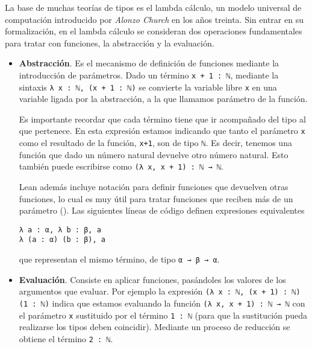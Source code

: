 La base de muchas teorías de tipos es el lambda cálculo, un modelo universal de
computación introducido por \textit{Alonzo Church} en los años treinta. Sin
entrar en su formalización, en el lambda cálculo se consideran dos operaciones
fundamentales para tratar con funciones, la abstracción y la evaluación.

\begin{itemize}

	\item \textbf{Abstracción}. Es el mecanismo de definición de funciones mediante
	      la introducción de parámetros. Dado un término \lstinline{x + 1 : ℕ},
	      mediante la sintaxis \lstinline{λ x : ℕ, (x + 1 : ℕ)} se convierte la
	      variable libre \lstinline{x} en una variable ligada por la abstracción, a la
	      que llamamos parámetro de la función.

	      Es importante recordar que cada término tiene que ir acompañado del tipo al
	      que pertenece. En esta expresión estamos indicando que tanto el parámetro
	      \lstinline{x} como el resultado de la función, \lstinline{x+1}, son de tipo
	      \lstinline{ℕ}. Es decir, tenemos una función que dado un número natural
	      devuelve otro número natural. Esto también puede escribirse como
	      \lstinline{(λ x, x + 1) : ℕ → ℕ}.

	      Lean además incluye notación para definir funciones que devuelven otras
	      funciones, lo cual es muy útil para tratar funciones que reciben más de un
	      parámetro (). Las siguientes líneas de código
	      definen expresiones equivalentes
	      \begin{lstlisting}
λ a : α, λ b : β, a
λ (a : α) (b : β), a
\end{lstlisting}
	      que representan el mismo término, de tipo \lstinline{α → β → α}.

	\item \textbf{Evaluación}. Consiste en aplicar funciones, pasándoles los
	      valores de los argumentos que evaluar. Por ejemplo la expresión
	      \lstinline{(λ x : ℕ, (x + 1) : ℕ) (1 : ℕ)} indica que estamos evaluando la
	      función \lstinline{(λ x, x + 1) : ℕ → ℕ} con el parámetro \lstinline{x}
	      sustituido por el término \lstinline{1 : ℕ} (para que la sustitución pueda
	      realizarse los tipos deben coincidir). Mediante un proceso de
	      reducción se obtiene el término \lstinline{2 : ℕ}.

\end{itemize}

